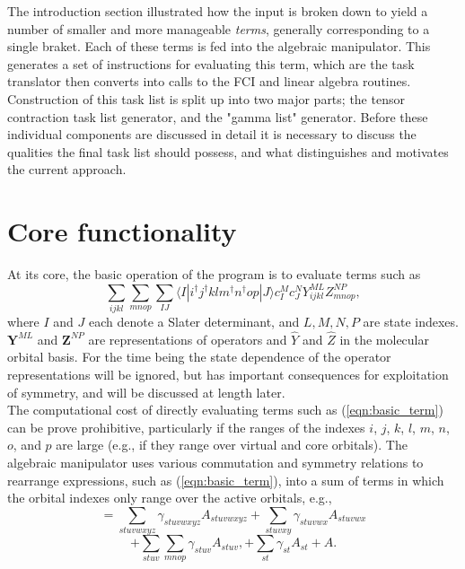 \noindent The introduction section illustrated how the input is broken down to yield a number of smaller and more manageable \emph{terms}, 
generally corresponding to a single braket. Each of these terms is fed into the algebraic manipulator. This generates a set of instructions for
evaluating this term, which are the task translator then converts into calls to the FCI and linear algebra routines. Construction
of this task list is split up into two major parts; the tensor contraction task list generator, and the 
"gamma list" generator. Before these individual components are discussed in detail it is necessary to discuss the qualities 
the final task list should possess, and what distinguishes and motivates the current approach. \\

\section{Core functionality}
\noindent At its core, the basic operation of the program is to evaluate terms such as 
\begin{equation}
\sum_{ijkl}\sum_{mnop} \sum_{IJ} \langle I | i^{\dagger}j^{\dagger}klm^{\dagger}n^{\dagger}op | J \rangle c^{M}_{I} c_{J}^{N} Y^{ML}_{ijkl}Z^{NP}_{mnop},
\label{eqn:basic_term}
\end{equation}
where $I$ and $J$ each denote a Slater determinant, and $L,M,N,P$ are state
indexes.  $\mathbf{Y}^{ML}$ and $\mathbf{Z}^{NP}$ are representations of
operators and $\hat{Y}$ and $\hat{Z}$ in the molecular orbital basis. For the time being
the state dependence of the operator representations will be ignored, but has important consequences
for exploitation of symmetry, and will be discussed at length later. \\ 

\noindent The computational cost of directly evaluating terms such as (\ref{eqn:basic_term}) can be prove prohibitive,
particularly if the ranges of the indexes $i$, $j$, $k$, $l$, $m$, $n$, $o$, and $p$ are large (e.g., if they
range over virtual and core orbitals). The algebraic manipulator uses various commutation and symmetry relations
to rearrange expressions, such as (\ref{eqn:basic_term}), into a sum of terms in which
the orbital indexes only range over the active orbitals, e.g.,
\begin{equation}
=\sum_{stuvwxyz}\gamma_{stuvwxyz} A_{stuvwxyz}
+\sum_{stuvxy} \gamma_{stuvwx} A_{stuvwx}
\end{equation}
\begin{equation}
+\sum_{stuv}\sum_{mnop} \gamma_{stuv} A_{stuv},
+\sum_{st} \gamma_{st}  A_{st}
+  A .
\label{eqn:A_list}
\end{equation}

